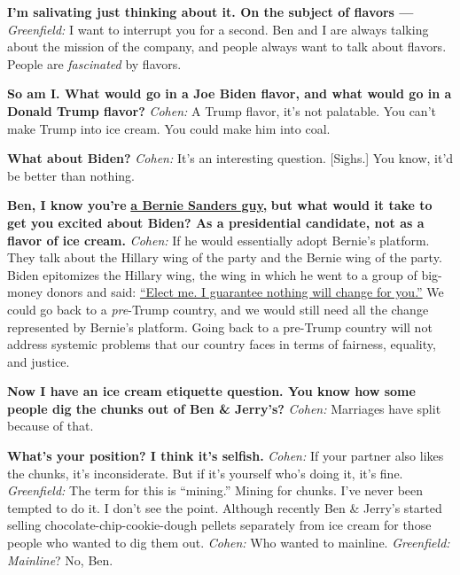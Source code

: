 \textbf{I'm salivating just thinking about it. On the subject of flavors
---} \emph{Greenfield:} I want to interrupt you for a second. Ben and I
are always talking about the mission of the company, and people always
want to talk about flavors. People are \emph{fascinated} by flavors.

\textbf{So am I. What would go in a Joe Biden flavor, and what would go
in a Donald Trump flavor?} \emph{Cohen:} A Trump flavor, it's not
palatable. You can't make Trump into ice cream. You could make him into
coal.

\textbf{What about Biden?} \emph{Cohen:} It's an interesting question.
{[}Sighs.{]} You know, it'd be better than nothing.

\textbf{Ben, I know you're}
\textbf{\href{http://nytimes.com\#tooltip-6}{a Bernie Sanders guy,}}
\textbf{but what would it take to get you excited about Biden? As a
presidential candidate, not as a flavor of ice cream.} \emph{Cohen:} If
he would essentially adopt Bernie's platform. They talk about the
Hillary wing of the party and the Bernie wing of the party. Biden
epitomizes the Hillary wing, the wing in which he went to a group of
big-money donors and said: \href{http://nytimes.com\#tooltip-7}{``Elect
me. I guarantee nothing will change for you.''} We could go back to a
\emph{pre}-Trump country, and we would still need all the change
represented by Bernie's platform. Going back to a pre-Trump country will
not address systemic problems that our country faces in terms of
fairness, equality, and justice.

\textbf{Now I have an ice cream etiquette question. You know how some
people dig the chunks out of Ben \& Jerry's?} \emph{Cohen:} Marriages
have split because of that.

\textbf{What's your position? I think it's selfish.} \emph{Cohen:} If
your partner also likes the chunks, it's inconsiderate. But if it's
yourself who's doing it, it's fine. \emph{Greenfield:} The term for this
is ``mining.'' Mining for chunks. I've never been tempted to do it. I
don't see the point. Although recently Ben \& Jerry's started selling
chocolate-chip-cookie-dough pellets separately from ice cream for those
people who wanted to dig them out. \emph{Cohen:} Who wanted to mainline.
\emph{Greenfield:} \emph{Mainline}? No, Ben.


